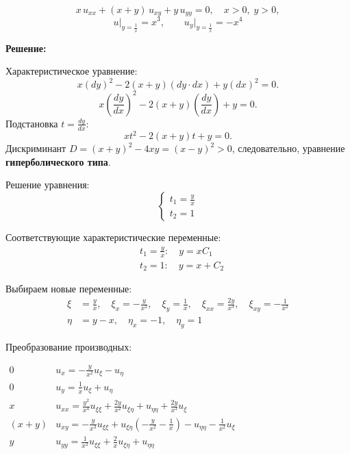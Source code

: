 \documentclass[a4paper,12pt]{article}
\begin{document}
\begin{equation*}\label{eq:orig}
    x\,u_{xx} + (x+y)\,u_{xy} + y\,u_{yy}=0,\quad x>0,\;y>0,
\end{equation*}
\[
u \Big|_{y=\frac{1}{x}} = x^3, \quad \quad  u_{y} \Big|_{y=\frac{1}{x}} = -x^4
\]

\textbf{Решение:}

Характеристическое уравнение:
\[
x\left({dy}\right)^2 - 2(x+y)\left({dy}\cdot{dx}\right) + y\left({dx}\right)^2=0.
\]
\[
x\left(\frac{dy}{dx}\right)^2 - 2(x+y)\left(\frac{dy}{dx}\right) + y=0.
\]
Подстановка $t = \frac{dy}{dx}$:
\[
xt^2 - 2(x+y)t + y=0.
\]
Дискриминант $D = (x+y)^2 - 4xy = (x-y)^2> 0$, следовательно, уравнение \textbf{гиперболического типа}.

Решение уравнения:
\begin{equation*}
    \begin{cases}
    t_1 = \frac{y}{x} \\
    t_2 = 1
    \end{cases}
\end{equation*}

Соответствующие характеристические переменные:
\begin{align*}
    &t_1 = \frac{y}{x}: \quad y = xC_1 \\
    &t_2 = 1: \quad y = x + C_2
\end{align*}

Выбираем новые переменные:
\begin{align*}
    \xi &= \frac{y}{x} , \quad \xi_x = -\frac{y}{x^2},  \quad \xi_y = \frac{1}{x},   \quad  \xi_{xx} = \frac{2y}{x^3},  \quad  \xi_{xy} = -\frac{1}{x^2} \\
    \eta &= y - x, \quad \eta_x = -1,  \quad \eta_y = 1
\end{align*}

Преобразование производных:
\begin{flushleft}
\(
\begin{array}{r|l}
0 & u_x = -\frac{y}{x^2} u_{\xi} - u_{\eta} \\
0 & u_y =\frac{1}{x} u_{\xi} + u_{\eta} \\
x & u_{xx} = \frac{y^2}{x^4} u_{\xi\xi} + \frac{2y}{x^2} u_{\xi\eta}  + u_{\eta\eta} + \frac{2y}{x^3} u_{\xi} \\
(x+y) & u_{xy} = -\frac{y}{x^3} u_{\xi\xi} + u_{\xi\eta} (-\frac{y}{x^2} - \frac{1}{x}) - u_{\eta\eta} - \frac{1}{x^2} u_{\xi} \\
y & u_{yy} = \frac{1}{x^2} u_{\xi\xi} + \frac{2}{x} u_{\xi\eta}  + u_{\eta\eta} 
\end{array}
\)
\end{flushleft}
\end{document}
